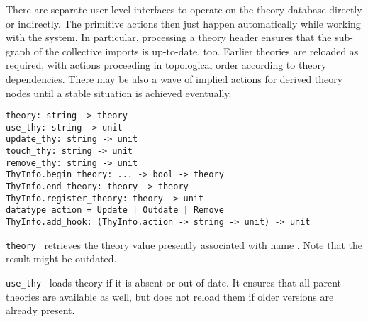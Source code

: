 \begin{isabellebody}
\begin{isamarkuptext}
  \medskip There are separate user-level interfaces to operate on the
  theory database directly or indirectly.  The primitive actions then
  just happen automatically while working with the system.  In
  particular, processing a theory header  ensures that the
  sub-graph of the collective imports 
  is up-to-date, too.  Earlier theories are reloaded as required, with
   actions proceeding in topological order according to
  theory dependencies.  There may be also a wave of implied  actions for derived theory nodes until a stable situation
  is achieved eventually.%
\end{isamarkuptext}%
\isamarkuptrue%
%
\isadelimmlref
%
\endisadelimmlref
%
\isatagmlref
%
\begin{isamarkuptext}%
\begin{mldecls}
  \verb|theory: string -> theory| \\
  \verb|use_thy: string -> unit| \\
  \verb|update_thy: string -> unit| \\
  \verb|touch_thy: string -> unit| \\
  \verb|remove_thy: string -> unit| \\[1ex]
  \verb|ThyInfo.begin_theory|\verb|: ... -> bool -> theory| \\
  \verb|ThyInfo.end_theory: theory -> theory| \\
  \verb|ThyInfo.register_theory: theory -> unit| \\[1ex]
  \verb|datatype action = Update |\verb,|,\verb| Outdate |\verb,|,\verb| Remove| \\
  \verb|ThyInfo.add_hook: (ThyInfo.action -> string -> unit) -> unit| \\
  \end{mldecls}

  \begin{description}

  \item \verb|theory|~ retrieves the theory value presently
  associated with name .  Note that the result might be
  outdated.

  \item \verb|use_thy|~ loads theory  if it is absent
  or out-of-date.  It ensures that all parent theories are available
  as well, but does not reload them if older versions are already
  present.


\end{description}
\end{isamarkuptext}
\end{isabellebody}
